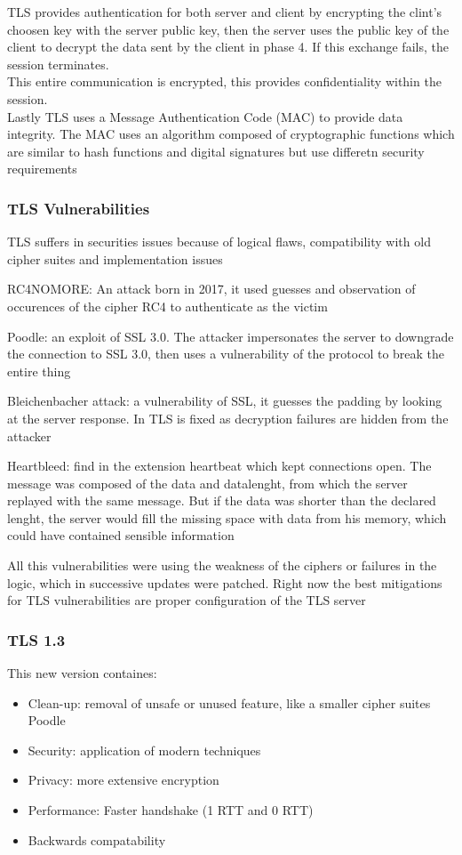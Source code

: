\documentclass[12pt, a4paper]{article}
\begin{document}
TLS provides authentication for both server and client by encrypting the clint's choosen key with the server public
key, then the server uses the public key of the client to decrypt the data sent by the client in phase 4. If this 
exchange fails, the session terminates.\\This entire communication is encrypted, this provides confidentiality 
within the session.\\Lastly TLS uses a Message Authentication Code (MAC) to provide data integrity. The MAC uses
an algorithm composed of cryptographic functions which are similar to hash functions and digital signatures but
use differetn security requirements

\subsubsection{TLS Vulnerabilities}
TLS suffers in securities issues because of logical flaws, compatibility with old cipher suites and implementation
issues

RC4NOMORE: An attack born in 2017, it used guesses and observation of occurences of the cipher RC4 to authenticate 
as the victim

Poodle: an exploit of SSL 3.0. The attacker impersonates the server to downgrade the connection to SSL 3.0, then 
uses a vulnerability of the protocol to break the entire thing

Bleichenbacher attack: a vulnerability of SSL, it guesses the padding by looking at the server response. In TLS
is fixed as decryption failures are hidden from the attacker

Heartbleed: find in the extension heartbeat which kept connections open. The message was composed of the data and 
datalenght, from which the server replayed with the same message. But if the data was shorter than the declared 
lenght, the server would fill the missing space with data from his memory, which could have contained sensible 
information

All this vulnerabilities were using the weakness of the ciphers or failures in the logic, which in successive 
updates were patched. Right now the best mitigations for TLS vulnerabilities are proper configuration of the 
TLS server

\subsubsection{TLS 1.3}
This new version containes:
\begin{itemize}
    \item Clean-up: removal of unsafe or unused feature, like a smaller cipher suites Poodle
    \item Security: application of modern techniques
    \item Privacy: more extensive encryption
    \item Performance: Faster handshake (1 RTT and 0 RTT)
    \item Backwards compatability
\end{itemize}
\end{document}
